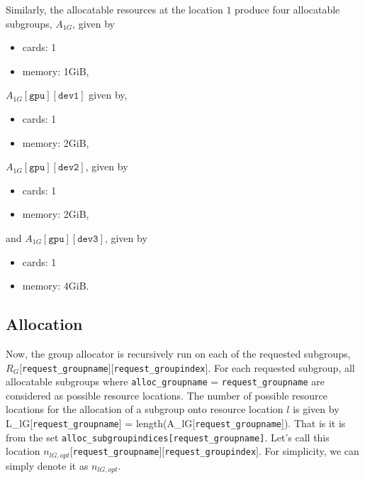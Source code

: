 \documentclass[12pt,onecolumn]{IEEEtran}
\newcommand{\ab}{\allowbreak}
\newcommand{\bus}{\_\allowbreak}
\begin{document}
Similarly, the allocatable resources at the location $1$ produce
four allocatable subgroups, $A_{1G}$\ab[\texttt{gpu}]\ab[\texttt{dev0}], given by
\ttfamily
\begin{itemize}
\item[] cards: 1
\item[] memory: 1GiB,
\end{itemize}
\normalfont
$A_{1G}[\texttt{gpu}][\texttt{dev1}]$ given by,
\ttfamily
\begin{itemize}
\item[] cards: 1
\item[] memory: 2GiB,
\end{itemize}
\normalfont
$A_{1G}[\texttt{gpu}][\texttt{dev2}]$, given by
\ttfamily
\begin{itemize}
\item[] cards: 1
\item[] memory: 2GiB,
\end{itemize}
\normalfont
and $A_{1G}[\texttt{gpu}][\texttt{dev3}]$, given by
\ttfamily
\begin{itemize}
\item[] cards: 1
\item[] memory: 4GiB.
\end{itemize}
\normalfont

\subsection{Allocation}

Now, the group allocator is recursively run on each of the requested
subgroups,
$R_G[$\texttt{req\-uest{\bus}group\-name}$][$\texttt{req\-uest{\bus}group\-index}$]$.
For each requested subgroup, all allocatable subgroups where
\texttt{alloc{\bus}group\-name} = \texttt{request{\bus}group\-name} are
considered as possible resource locations.
The number of possible resource locations for 
the allocation of a subgroup onto resource location $l$ is given by
\bea
L_{lG}[\texttt{request{\bus}groupname}] = 
  \mbox{length}(A_{lG}[\texttt{request{\bus}groupname}]).
\eea
That is it is from the
set \texttt{alloc{\bus}subgroupindices[request{\bus}groupname]}.
Let's call this location 
$n_{lG,opt}[$\texttt{req\-uest{\bus}group\-name}$]
  [$\texttt{req\-uest{\bus}group\-index}$]$.
For simplicity, we can simply denote it as $n_{lG,opt}$.
\end{document}
